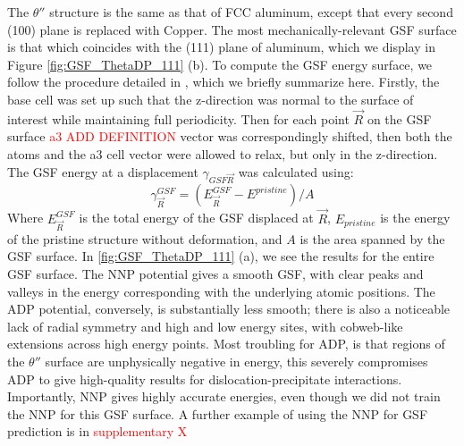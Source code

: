 \documentclass{article}
\begin{document}
The $\theta''$ structure is the same as that of FCC aluminum, except that every second (100) plane is replaced with Copper.
The most mechanically-relevant GSF surface is that which coincides with the (111) plane of aluminum, which we display in Figure \ref{fig:GSF_ThetaDP_111} (b).
To compute the GSF energy surface, we follow the procedure detailed in \cite{Yin2017a}, which we briefly summarize here.
Firstly, the base cell was set up such that the z-direction was normal to the surface of interest while maintaining full periodicity.
Then for each point $\vec{R}$ on the GSF surface \textcolor{red}{a3 ADD DEFINITION} vector was correspondingly shifted, then both the atoms and the a3 cell vector were allowed to relax, but only in the z-direction.
The GSF energy at a displacement $\gamma_{GSF\vec{R}}$ was calculated using: 
\begin{equation}
\gamma^{GSF}_{\vec{R}} = (E^{GSF}_{\vec{R}} - E^{pristine})/A
\end{equation}
Where $E^{GSF}_{\vec{R}}$ is the total energy of the GSF displaced at $\vec{R}$, $E_{pristine}$ is the 
energy of the pristine structure without deformation, and $A$ is the area spanned by the GSF surface.
In \ref{fig:GSF_ThetaDP_111} (a), we see the results for the entire GSF surface.
The NNP potential gives a smooth GSF, with clear peaks and valleys in the energy corresponding with the underlying atomic positions.
The ADP potential, conversely, is substantially less smooth; there is also a noticeable lack of radial symmetry and high and low energy sites,  with cobweb-like extensions across high energy points.
Most troubling for ADP, is that regions of the $\theta''$ surface are unphysically negative in energy, this severely compromises ADP to give high-quality results for dislocation-precipitate interactions.
Importantly, NNP gives highly accurate energies, even though we did not train the NNP for this GSF surface.
A further example of using the NNP for GSF prediction is in \textcolor{red}{supplementary X}
\end{document}
